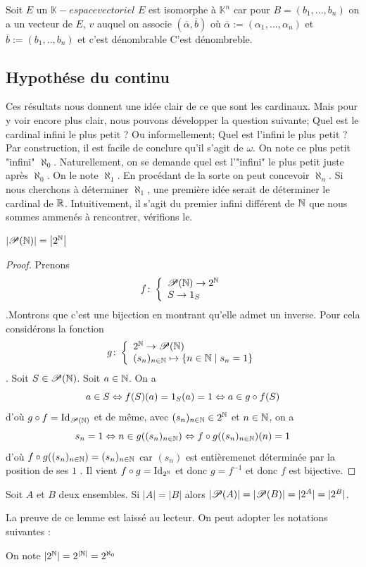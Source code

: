 \begin{tikzpicture}[x=0.75pt,y=0.75pt,yscale=-1,xscale=1]
\end{tikzpicture}

\begin{exemple}
Soit $E$ un $\mathbb{K}-espace vectoriel$ $E$ est isomorphe à $\mathbb{K}^n$ car pour $B=(b_1,...,b_n)$ on a un vecteur de $E$, $v$ auquel on associe $(\overline{\alpha},\overline{b})$ où $\overline{\alpha}:=(\alpha_1,...,\alpha_n)$ et $\overline{b}:=(b_1,..,b_n)$ et c'est dénombrable C'est dénombreble.
\end{exemple}

\subsection{Hypothése du continu}
Ces résultats nous donnent une idée clair de ce que sont les cardinaux. Mais pour y voir encore plus clair, nous pouvons développer la question suivante; Quel est le cardinal infini le plus petit ? Ou informellement; Quel est l'infini le plus petit ? 
Par construction, il est facile de conclure qu'il s'agit de $\omega$.
On note ce plus petit "infini" $\aleph_0$. Naturellement, on se demande quel est l'"infini" le plus petit juste après $\aleph_0$. On le note $\aleph_1$. En procédant de la sorte on peut concevoir $\aleph_n$. Si nous cherchons à déterminer $\aleph_1$, une première idée serait de déterminer le cardinal de $\mathbb{R}$. Intuitivement, il s'agit du premier infini différent de $\mathbb{N}$ que nous sommes ammenés à rencontrer, vérifions le. 
\begin{proposition}
    $\left| \mathscr{P}(\mathbb{N}) \right|= \left| 2^{\mathbb{N}} \right|$
\end{proposition}
\begin{proof}
    Prenons $$f\colon \left\{\begin{array}{l}\mathscr{P}(\mathbb{N})\to 2^{\mathbb{N}} \\S\to 1_S\end{array}\right.$$.Montrons que c'est une bijection en montrant qu'elle admet un inverse. Pour cela considérons la fonction $$g\colon \left\{\begin{array}{l}2^{\mathbb{N}} \to \mathscr{P}(\mathbb{N}) \\(s_n)_{n\in\mathbb{N}}\mapsto \{n\in\mathbb{N}\mid s_n = 1\}\end{array}\right.$$. Soit $S\in\mathscr{P}(\mathbb{N})$. Soit $a\in\mathbb{N}$. On a $$a\in S\Leftrightarrow f(S)(a) = 1_S(a) = 1\Leftrightarrow a \in g\circ f(S)$$ d'où $g\circ f = \operatorname{Id_{\mathscr{P}(\mathbb{N})}}$ et de même, avec $(s_n)_{n\in\mathbb{N}}\in2^{\mathbb{N}}$ et $n\in\mathbb{N}$, on a  $$s_n = 1 \Leftrightarrow n\in g((s_n)_{n\in\mathbb{N}})\Leftrightarrow f\circ g ((s_n)_{n\in\mathbb{N}})(n) = 1 $$ d'où $f\circ g ((s_n)_{n\in\mathbb{N}}) = (s_n)_{n\in\mathbb{N}}$ car $(s_n)$ est entièremenet déterminée par la position de ses \og $1$ \fg. Il vient $f\circ g = \operatorname{Id}_{2^{\mathbb{N}}}$ et donc $g=f^{-
    1}$ et donc $f$ est bijective.
\end{proof}

\begin{lemme}
    Soit $A$ et $B$ deux ensembles. Si $|A|=|B|$ alors $|\mathscr{P}(A)|=|\mathscr{P}(B)|=|2^A|=|2^B|$.
\end{lemme}
La preuve de ce lemme est laissé au lecteur. On peut adopter les notations suivantes :
\begin{notation}
    On note $|2^{\mathbb{N}}|=2^{|\mathbb{N}|}= 2^{\aleph_0}$
\end{notation}

